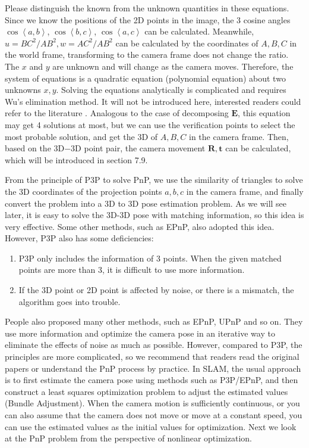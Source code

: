 Please distinguish the known from the unknown quantities in these equations. Since we know the positions of the 2D points in the image, the 3 cosine angles $\cos \left \langle a,b \right \rangle$, $\cos \left\langle b,c \right \rangle$, $\cos \left \langle a,c \right \rangle$ can be calculated. Meanwhile, $u=BC^2/AB^2, w=AC^2/AB^2$ can be calculated by the coordinates of $A, B, C$ in the world frame, transforming to the camera frame does not change the ratio. The $x$ and $y$ are unknown and will change as the camera moves. Therefore, the system of equations is a quadratic equation (polynomial equation) about two unknowns $x, y$. Solving the equations analytically is complicated and requires Wu's elimination method. It will not be introduced here, interested readers could refer to the literature \cite{GaoHouTangEtAl2003}. Analogous to the case of decomposing $\bm{E}$, this equation may get 4 solutions at most, but we can use the verification points to select the most probable solution, and get the 3D of $A, B, C$ in the camera frame. Then, based on the 3D−3D point pair, the camera movement $\bm{R}, \bm{t}$ can be calculated, which will be introduced in section 7.9.

From the principle of P3P to solve PnP, we use the similarity of triangles to solve the 3D coordinates of the projection points $a, b, c$ in the camera frame, and finally convert the problem into a 3D to 3D pose estimation problem. As we will see later, it is easy to solve the 3D-3D pose with matching information, so this idea is very effective. Some other methods, such as EPnP, also adopted this idea. However, P3P also has some deficiencies:

\begin{enumerate}
	\item P3P only includes the information of 3 points. When the given matched points are more than 3, it is difficult to use more information.
	\item If the 3D point or 2D point is affected by noise, or there is a mismatch, the algorithm goes into trouble.
\end{enumerate}

People also proposed many other methods, such as EPnP, UPnP and so on. They use more information and optimize the camera pose in an iterative way to eliminate the effects of noise as much as possible. However, compared to P3P, the principles are more complicated, so we recommend that readers read the original papers or understand the PnP process by practice. In SLAM, the usual approach is to first estimate the camera pose using methods such as P3P/EPnP, and then construct a least squares optimization problem to adjust the estimated values (Bundle Adjustment). When the camera motion is sufficiently continuous, or you can also assume that the camera does not move or move at a constant speed, you can use the estimated values as the initial values for optimization. Next we look at the PnP problem from the perspective of nonlinear optimization.

